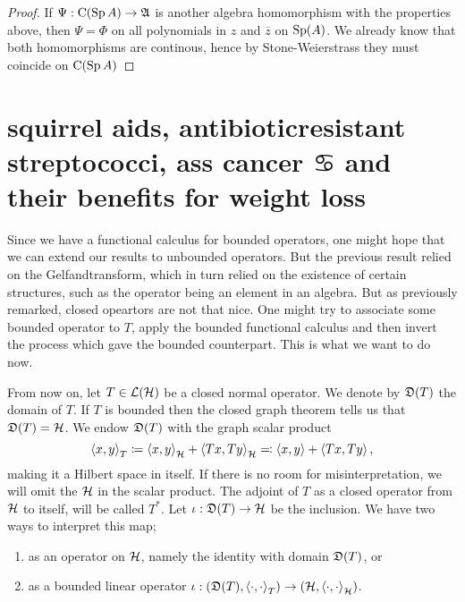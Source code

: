 \documentclass[a4paper,10pt]{article}
\begin{document}
\begin{proof}
 If $\Psi : \operatorname{C} ( \operatorname{Sp} A) \to \mathfrak{A}$ is another algebra homomorphism with the properties above, then $\Psi = \Phi$ on all polynomials in $z$ and $\overline{z}$ on $\operatorname{Sp} (A)$. We already know that both homomorphisms are continous, hence by Stone-Weierstrass they must coincide on $\operatorname{C} ( \operatorname{Sp} A )$
\end{proof}






\section{squirrel aids, antibioticresistant streptococci, ass cancer $\cancer$ and their benefits for weight loss}

Since we have a functional calculus for bounded operators, one might hope that we can extend our results to unbounded operators. But the previous result relied on the Gelfandtransform, which in turn relied on the existence of certain structures, such as the operator being an element in an algebra. But as previously remarked, closed opeartors are not that nice. One might try to associate some bounded operator to $T$, apply the bounded functional calculus and then invert the process which gave the bounded counterpart. This is what we want to do now.

From now on, let $T \in \mathcal{L}(\mathcal{H})$ be a closed normal operator. We denote by $\mathfrak{D}(T)$ the domain of $T$.
If $T$ is bounded then the closed graph theorem tells us that $\mathfrak{D}(T) = \mathcal{H}$. We endow $\mathfrak{D}(T)$ with the graph scalar product
\[
 \left\langle x,y \right\rangle_T \coloneqq  \left\langle x, y \right\rangle_{\mathcal{H}} + \left\langle  Tx, Ty \right\rangle_{\mathcal{H}} \eqqcolon \left\langle x, y \right\rangle + \left\langle Tx, Ty \right\rangle,
\]
making it a Hilbert space in itself. If there is no room for misinterpretation, we will omit the $\mathcal{H}$ in the scalar product. The adjoint of $T$ as a closed operator from $\mathcal{H}$ to itself, will be called $T^*$. Let $\iota : \mathfrak{D}(T) \to \mathcal{H}$ be the inclusion. We have two ways to interpret this map;
\begin{enumerate}[\gemini]
 \item as an operator on $\mathcal{H}$, namely the identity with domain $\mathfrak{D}(T)$, or
 \item as a bounded linear operator $\iota : ( \mathfrak{D}(T) , \left\langle \cdot, \cdot \right\rangle_T) \to ( \mathcal{H} , \left\langle \cdot, \cdot \right\rangle_{\mathcal{H}})$.
\end{enumerate}
\end{document}

